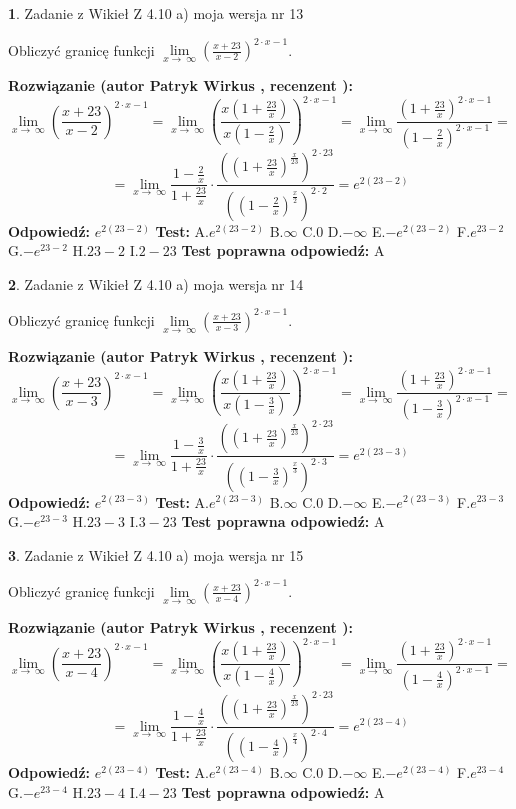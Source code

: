 \documentclass[12pt, a4paper]{article}
\theoremstyle{definition} %
\newtheorem{zad}{}
\newcommand{\zadStart}[1]{\begin{zad}#1\newline}
\newcommand{\zadStop}{\end{zad}}
\newcommand{\rozwStart}[2]{\noindent \textbf{Rozwiązanie (autor #1 , recenzent #2): }\newline}
\newcommand{\rozwStop}{\newline}
\newcommand{\odpStart}{\noindent \textbf{Odpowiedź:}\newline}
\newcommand{\odpStop}{\newline}
\newcommand{\testStart}{\noindent \textbf{Test:}\newline}
\newcommand{\testStop}{\newline}
\newcommand{\kluczStart}{\noindent \textbf{Test poprawna odpowiedź:}\newline}
\newcommand{\kluczStop}{\newline}
\begin{document}
\zadStart{Zadanie z Wikieł Z 4.10 a) moja wersja nr 13}


Obliczyć granicę funkcji  $\lim\limits_{x\to\ \infty}(\frac{x+23}{x-2})^{2\cdot x-1}$.
\zadStop
\rozwStart{Patryk Wirkus}{}
$$\lim\limits_{x\to\ \infty}(\frac{x+23}{x-2})^{2\cdot x-1} = \lim\limits_{x\to\ \infty}(\frac{x(1+\frac{23}{x})}{x(1-\frac{2}{x})})^{2\cdot x-1}=\lim\limits_{x\to\ \infty}\frac{(1+\frac{23}{x})^{2\cdot x-1}}{(1-\frac{2}{x})^{2\cdot x-1}}=$$
$$=\lim\limits_{x\to\ \infty}\frac{1-\frac{2}{x}}{1+\frac{23}{x}}\cdot\frac{((1+\frac{23}{x})^{\frac{x}{23}})^{2\cdot23}}{((1-\frac{2}{x})^{\frac{x}{2}})^{2\cdot2}}=e^{2(23-2)}$$
\rozwStop
\odpStart
$e^{2(23-2)}$
\odpStop
\testStart
A.$e^{2(23-2)}$ B.$\infty$ C.$0$ D.$-\infty$ E.$-e^{2(23-2)}$
F.$e^{23-2}$ G.$-e^{23-2}$
H.$23-2$
I.$2-23$
\testStop
\kluczStart
A
\kluczStop



\zadStart{Zadanie z Wikieł Z 4.10 a) moja wersja nr 14}


Obliczyć granicę funkcji  $\lim\limits_{x\to\ \infty}(\frac{x+23}{x-3})^{2\cdot x-1}$.
\zadStop
\rozwStart{Patryk Wirkus}{}
$$\lim\limits_{x\to\ \infty}(\frac{x+23}{x-3})^{2\cdot x-1} = \lim\limits_{x\to\ \infty}(\frac{x(1+\frac{23}{x})}{x(1-\frac{3}{x})})^{2\cdot x-1}=\lim\limits_{x\to\ \infty}\frac{(1+\frac{23}{x})^{2\cdot x-1}}{(1-\frac{3}{x})^{2\cdot x-1}}=$$
$$=\lim\limits_{x\to\ \infty}\frac{1-\frac{3}{x}}{1+\frac{23}{x}}\cdot\frac{((1+\frac{23}{x})^{\frac{x}{23}})^{2\cdot23}}{((1-\frac{3}{x})^{\frac{x}{3}})^{2\cdot3}}=e^{2(23-3)}$$
\rozwStop
\odpStart
$e^{2(23-3)}$
\odpStop
\testStart
A.$e^{2(23-3)}$ B.$\infty$ C.$0$ D.$-\infty$ E.$-e^{2(23-3)}$
F.$e^{23-3}$ G.$-e^{23-3}$
H.$23-3$
I.$3-23$
\testStop
\kluczStart
A
\kluczStop



\zadStart{Zadanie z Wikieł Z 4.10 a) moja wersja nr 15}


Obliczyć granicę funkcji  $\lim\limits_{x\to\ \infty}(\frac{x+23}{x-4})^{2\cdot x-1}$.
\zadStop
\rozwStart{Patryk Wirkus}{}
$$\lim\limits_{x\to\ \infty}(\frac{x+23}{x-4})^{2\cdot x-1} = \lim\limits_{x\to\ \infty}(\frac{x(1+\frac{23}{x})}{x(1-\frac{4}{x})})^{2\cdot x-1}=\lim\limits_{x\to\ \infty}\frac{(1+\frac{23}{x})^{2\cdot x-1}}{(1-\frac{4}{x})^{2\cdot x-1}}=$$
$$=\lim\limits_{x\to\ \infty}\frac{1-\frac{4}{x}}{1+\frac{23}{x}}\cdot\frac{((1+\frac{23}{x})^{\frac{x}{23}})^{2\cdot23}}{((1-\frac{4}{x})^{\frac{x}{4}})^{2\cdot4}}=e^{2(23-4)}$$
\rozwStop
\odpStart
$e^{2(23-4)}$
\odpStop
\testStart
A.$e^{2(23-4)}$ B.$\infty$ C.$0$ D.$-\infty$ E.$-e^{2(23-4)}$
F.$e^{23-4}$ G.$-e^{23-4}$
H.$23-4$
I.$4-23$
\testStop
\kluczStart
A
\kluczStop
\end{document}
